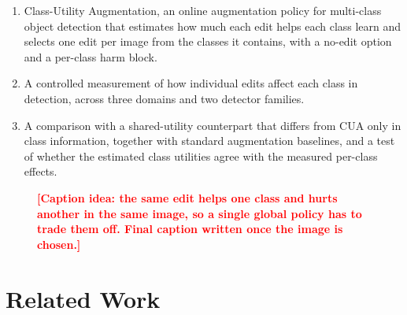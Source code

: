\documentclass[conference]{IEEEtran}
\newcommand{\todo}[1]{\textcolor{red}{\textbf{[#1]}}}
\begin{document}
\begin{enumerate}
    \item Class-Utility Augmentation, an online augmentation policy for multi-class object detection that estimates how much each edit helps each class learn and selects one edit per image from the classes it contains, with a no-edit option and a per-class harm block.
    \item A controlled measurement of how individual edits affect each class in detection, across three domains and two detector families.
    \item A comparison with a shared-utility counterpart that differs from CUA only in class information, together with standard augmentation baselines, and a test of whether the estimated class utilities agree with the measured per-class effects.
\end{enumerate}

\begin{figure}[t]
\centering
{}
\caption[Teaser]{\todo{Caption idea: the same edit helps one class and hurts another in the same image, so a single global policy has to trade them off. Final caption written once the image is chosen.}}
\label{fig:teaser}
\end{figure}

\section{Related Work}
\label{sec:related}
\end{document}
